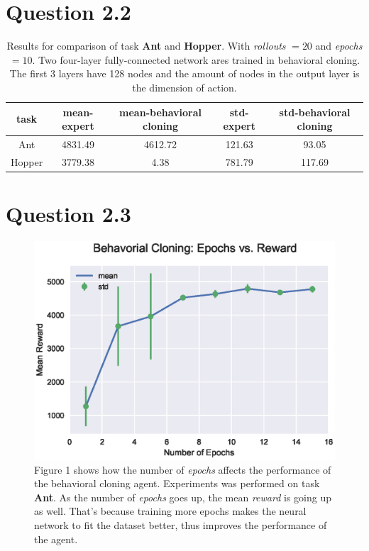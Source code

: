 \documentclass[12pt]{article}
\begin{document}
\pagebreak

\section{Question 2.2}
\begin{table}[!h]
\begin{tabular}{@{}c|cccc@{}}
\toprule
task   & mean-expert & mean-behavioral cloning & std-expert & std-behavioral cloning \\ \midrule
Ant    & 4831.49     & 4612.72                 & 121.63     & 93.05                  \\
Hopper & 3779.38     & 4.38                    & 781.79     & 117.69                              \\ \bottomrule
\end{tabular}
\caption{Results for comparison of task {\bf Ant} and {\bf Hopper}. With {\em rollouts} $= 20$ and {\em epochs} $ = 10$. Two four-layer fully-connected network ares trained in behavioral cloning. The first 3 layers have 128 nodes and the amount of nodes in the output layer is the dimension of action.}
\end{table}

\section{Question 2.3}

\begin{figure}[!h]
\centering
\includegraphics[width=5in]{2-2.eps}
\caption{Figure 1 shows how the number of {\em epochs} affects the performance of the behavioral cloning agent. Experiments was performed on task {\bf Ant}. As the number of {\em epochs} goes up, the mean {\em reward} is going up as well. That's because training more epochs makes the neural network to fit the dataset better, thus improves the performance of the agent.}
\end{figure}
\end{document}
